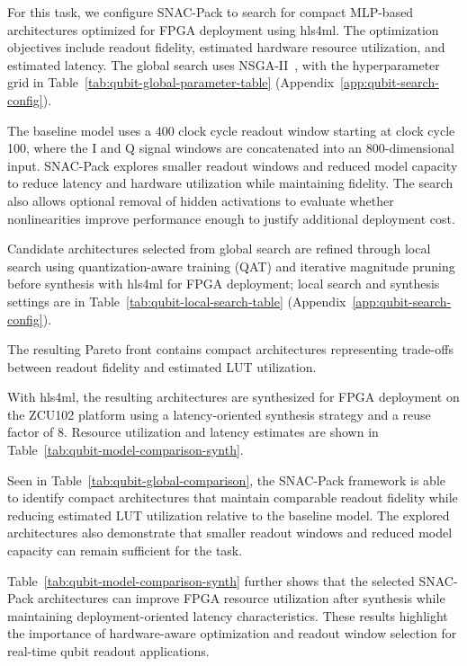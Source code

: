 \documentclass[11pt]{article}
\begin{document}
For this task, we configure SNAC-Pack to search for compact MLP-based architectures optimized for FPGA deployment using hls4ml. The optimization objectives include readout fidelity, estimated hardware resource utilization, and estimated latency. The global search uses NSGA-II~\cite{NSGA}, with the hyperparameter grid in Table~\ref{tab:qubit-global-parameter-table} (Appendix~\ref{app:qubit-search-config}).

The baseline model uses a 400 clock cycle readout window starting at clock cycle 100, where the I and Q signal windows are concatenated into an 800-dimensional input. SNAC-Pack explores smaller readout windows and reduced model capacity to reduce latency and hardware utilization while maintaining fidelity. The search also allows optional removal of hidden activations to evaluate whether nonlinearities improve performance enough to justify additional deployment cost.

Candidate architectures selected from global search are refined through local search using quantization-aware training (QAT) and iterative magnitude pruning before synthesis with hls4ml for FPGA deployment; local search and synthesis settings are in Table~\ref{tab:qubit-local-search-table} (Appendix~\ref{app:qubit-search-config}).

The resulting Pareto front contains compact architectures representing trade-offs between readout fidelity and estimated LUT utilization.

With hls4ml, the resulting architectures are synthesized for FPGA deployment on the ZCU102 platform using a latency-oriented synthesis strategy and a reuse factor of 8. Resource utilization and latency estimates are shown in Table~\ref{tab:qubit-model-comparison-synth}.

Seen in Table~\ref{tab:qubit-global-comparison}, the SNAC-Pack framework is able to identify compact architectures that maintain comparable readout fidelity while reducing estimated LUT utilization relative to the baseline model. The explored architectures also demonstrate that smaller readout windows and reduced model capacity can remain sufficient for the task.

Table~\ref{tab:qubit-model-comparison-synth} further shows that the selected SNAC-Pack architectures can improve FPGA resource utilization after synthesis while maintaining deployment-oriented latency characteristics. These results highlight the importance of hardware-aware optimization and readout window selection for real-time qubit readout applications.
\end{document}
